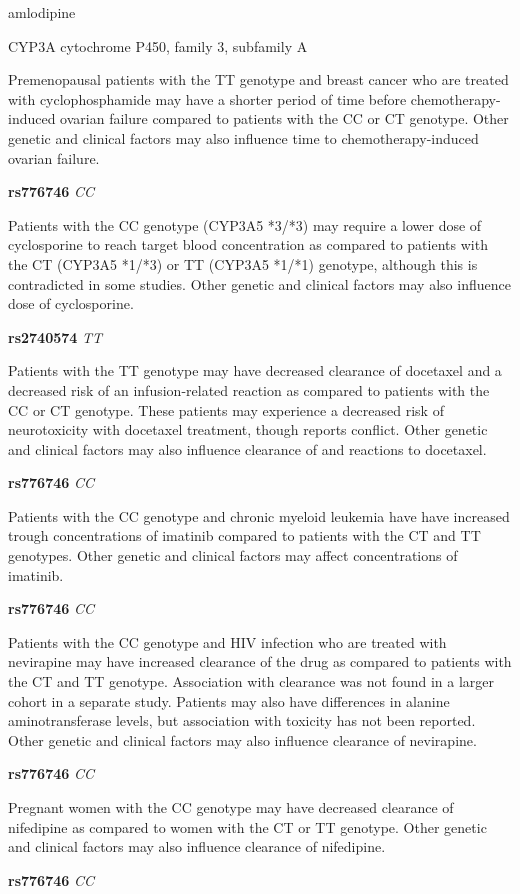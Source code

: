 \documentclass{resume} %
\begin{document}
\begin{rSection}{ amlodipine }
\begin{rSubsection}{ CYP3A }{ cytochrome P450, family 3, subfamily A }{}{}
\item[] Premenopausal patients with the TT genotype and breast cancer who are treated with cyclophosphamide may have a shorter period of time before chemotherapy-induced ovarian failure compared to patients with the CC or CT genotype. Other genetic and clinical factors may also influence time to chemotherapy-induced ovarian failure.\item \textbf{ rs776746 } \textit{ CC }
\item[] Patients with the CC genotype (CYP3A5 *3/*3) may require a lower dose of cyclosporine to reach target blood concentration as compared to patients with the CT (CYP3A5 *1/*3) or TT (CYP3A5 *1/*1) genotype, although this is contradicted in some studies. Other genetic and clinical factors may also influence dose of cyclosporine.\item \textbf{ rs2740574 } \textit{ TT }
\item[] Patients with the TT genotype may have decreased clearance of docetaxel and a decreased risk of an infusion-related reaction as compared to patients with the CC or CT genotype. These patients may experience a decreased risk of neurotoxicity with docetaxel treatment, though reports conflict. Other genetic and clinical factors may also influence clearance of and reactions to docetaxel.\item \textbf{ rs776746 } \textit{ CC }
\item[] Patients with the CC genotype and chronic myeloid leukemia have have increased trough concentrations of imatinib compared to patients with the CT and TT genotypes. Other genetic and clinical factors may affect concentrations of imatinib.\item \textbf{ rs776746 } \textit{ CC }
\item[] Patients with the CC genotype and HIV infection who are treated with nevirapine may have increased clearance of the drug as compared to patients with the CT and TT genotype. Association with clearance was not found in a larger cohort in a separate study. Patients may also have differences in alanine aminotransferase levels, but association with toxicity has not been reported. Other genetic and clinical factors may also influence clearance of nevirapine.\item \textbf{ rs776746 } \textit{ CC }
\item[] Pregnant women with the CC genotype may have decreased clearance of nifedipine as compared to women with the CT or TT genotype. Other genetic and clinical factors may also influence clearance of nifedipine.\item \textbf{ rs776746 } \textit{ CC }

\end{rSubsection}
\end{rSection}
\end{document}
